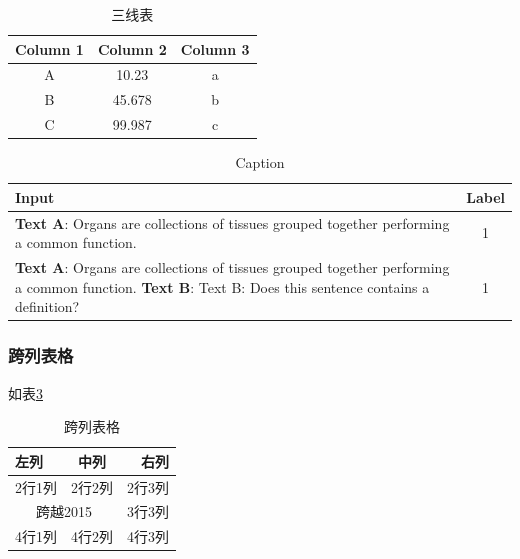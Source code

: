 \begin{table}[h!]
    \centering
      \begin{tabular}{ccc}
        \toprule 
        \textbf{Column 1} & \textbf{Column 2} & \textbf{Column 3}\\
        \midrule
        A & 10.23 & a\\
        B & 45.678 & b\\
        C & 99.987 & c\\
        \bottomrule
      \end{tabular}
    \caption{三线表}
    \label{tab:mytab2_}
\end{table}

\begin{table}[t!]
    \centering
    \small 
    \begin{tabularx}{0.5\linewidth}{X|c} %
    \toprule
      Input   &  Label \\
    \midrule
     \textbf{Text A}:  Organs are collections of tissues grouped together performing a common function.
  &  1  \\ 
   \midrule  
  \textbf{Text A}: Organs are collections of tissues grouped together performing a common function. 
  \textbf{Text B}: Text B: Does this sentence contains a definition? 
& 1 \\ 
    \bottomrule
    \end{tabularx}
    \caption{Caption}
    \label{tab:my_label}
\end{table}

\subsubsection{跨列表格}
如表\ref{tab:mytab3}
\begin{table}[htbp]
    \centering
    \begin{tabular}{|l|c|r|}
      \hline
      左列 & 中列 & 右列 \\
      \hline
      2行1列 & 2行2列 & 2行3列 \\
      \hline
      \multicolumn{2}{|c|}{跨越2015} & 3行3列 \\
      \hline
      4行1列 & 4行2列 & 4行3列 \\
      \hline
    \end{tabular}
    \caption{跨列表格}
    \label{tab:mytab3}
\end{table}

